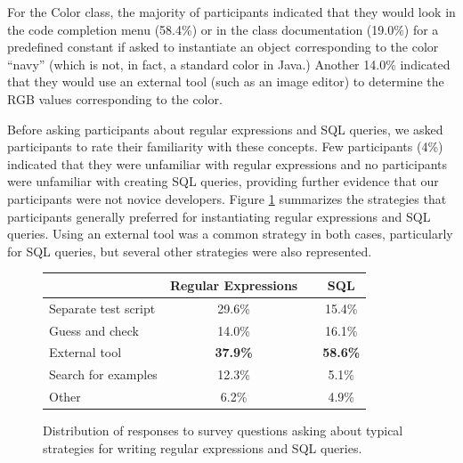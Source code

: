 \documentclass[10pt, conference, compsocconf]{IEEEtran}
\begin{document}
For the Color class, the majority of participants indicated that they would look in the code completion menu (58.4\%) or in the class documentation (19.0\%) for a predefined constant if asked to instantiate an object corresponding to the color ``navy'' (which is not, in fact, a standard color in Java.) Another 14.0\% indicated that they would use an external tool (such as an image editor) to determine the RGB values corresponding to the color. 
 
Before asking participants about regular expressions and SQL queries, we asked participants to rate their familiarity with these concepts. Few participants (4\%) indicated that they were unfamiliar with regular expressions and no participants were unfamiliar with creating SQL queries, providing further evidence that our participants were not novice developers. Figure \ref{strategies} summarizes the strategies that participants generally preferred for instantiating regular expressions and SQL queries. Using an external tool was a common strategy in both cases, particularly for SQL queries, but several other strategies were also represented.

\begin{figure}
\vspace{2mm}
\begin{tabular}{lccc}
 & Regular Expressions &  & SQL\\
 \hline
Separate test script & 29.6\% &  & 15.4\%\\
Guess and check & 14.0\% &  & 16.1\%\\
External tool & \textbf{37.9\%} &  & \textbf{58.6\%}\\
Search for examples & 12.3\% & & 5.1\% \\
Other & 6.2\% & & 4.9\% \\
\hline
\end{tabular}
\caption{Distribution of responses to survey questions asking about typical strategies for writing regular expressions and SQL queries.}
\label{strategies}
\vspace{-2mm}
\end{figure}
\end{document}
